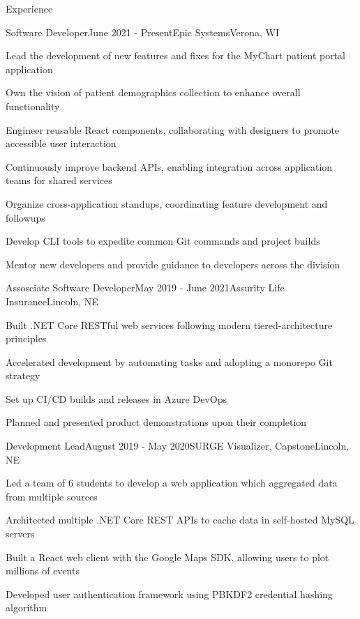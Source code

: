 \documentclass[
	10pt, %
]{article} %
\begin{document}
\begin{rSection}{Experience}

	\begin{rSubsection}{Software Developer}{June 2021 - Present}{Epic Systems}{Verona, WI}
		\item Lead the development of new features and fixes for the MyChart patient portal application
		\item Own the vision of patient demographics collection to enhance overall functionality
		\item Engineer reusable React components, collaborating with designers to promote accessible user interaction
		\item Continuously improve backend APIs, enabling integration across application teams for shared services
		\item Organize cross-application standups, coordinating feature development and followups
		\item Develop CLI tools to expedite common Git commands and project builds
		\item Mentor new developers and provide guidance to developers across the division
	\end{rSubsection}

	\begin{rSubsection}{Assosciate Software Developer}{May 2019 - June 2021}{Assurity Life Insurance}{Lincoln, NE}
		\item Built .NET Core RESTful web services following modern tiered-architecture principles
		\item Accelerated development by automating tasks and adopting a monorepo Git strategy
		\item Set up CI/CD builds and releases in Azure DevOps
		\item Planned and presented product demonstrations upon their completion
	\end{rSubsection}

	\begin{rSubsection}{Development Lead}{August 2019 - May 2020}{SURGE Visualizer, Capstone}{Lincoln, NE}
		\item Led a team of 6 students to develop a web application which aggregated data from multiple sources
		\item Architected multiple .NET Core REST APIs to cache data in self-hosted MySQL servers
		\item Built a React web client with the Google Maps SDK, allowing users to plot millions of events
		\item Developed user authentication framework using PBKDF2 credential hashing algorithm
	\end{rSubsection}


\end{rSection}
\end{document}

